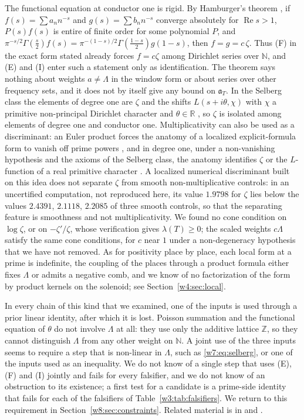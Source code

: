 \documentclass[11pt]{amsart}
\theoremstyle{definition}
\theoremstyle{remark}
\numberwithin{equation}{section}
\newcommand{\R}{\mathbb{R}}
\newcommand{\N}{\mathbb{N}}
\newcommand{\Z}{\mathbb{Z}}
\DeclareMathOperator{\Rel}{Re}
\newcommand{\aT}{\mathfrak{a}_T}                       %
\newcommand{\lam}{\lambda(T)}                          %
\begin{document}
The functional equation at conductor one is rigid. By Hamburger's theorem \cite{Hamburger1921}, if
$f(s)=\sum a_nn^{-s}$ and $g(s)=\sum b_nn^{-s}$ converge absolutely for $\Rel s>1$, $P(s)f(s)$ is entire of
finite order for some polynomial $P$, and
$\pi^{-s/2}\Gamma(\frac s2)f(s)=\pi^{-(1-s)/2}\Gamma(\frac{1-s}2)g(1-s)$, then $f=g=c\,\zeta$. Thus (F) in the
exact form stated already forces $f=c\zeta$ among Dirichlet series over $\N$, and (E) and (I) enter such a
statement only as identification. The theorem says nothing about weights $a\ne\Lambda$ in the window form or
about series over other frequency sets, and it does not by itself give any bound on $\aT$. In the Selberg
class the elements of degree one are $\zeta$ and the shifts $L(s+i\theta,\chi)$ with $\chi$ a primitive
non-principal Dirichlet character and $\theta\in\R$ \cite{KaczorowskiPerelli1999}, so $\zeta$ is isolated
among elements of degree one and conductor one. Multiplicativity can also be used as a discriminant: an Euler
product forces the anatomy of a localized explicit-formula form to vanish off prime powers
\cite[Theorem~3.1]{P10}, and in degree one, under a non-vanishing hypothesis and the axioms of the Selberg
class, the anatomy identifies $\zeta$ or the $L$-function of a real primitive character
\cite[Theorem~10.1]{P10}. A localized numerical discriminant built on this idea does not separate $\zeta$ from
smooth non-multiplicative controls: in an uncertified computation, not reproduced here, its value $1.9798$ for
$\zeta$ lies below the values $2.4391$, $2.1118$, $2.2085$ of three smooth controls, so that the separating
feature is smoothness and not multiplicativity. We found no cone condition on $\log\zeta$, or on
$-\zeta'/\zeta$, whose verification gives $\lam\ge0$; the scaled weights $c\Lambda$ satisfy the same cone
conditions, for $c$ near $1$ under a non-degeneracy hypothesis that we have not removed. As for positivity
place by place, each local form at a prime is indefinite, the coupling of the places through a product formula
either fixes $\Lambda$ or admits a negative comb, and we know of no factorization of the form by product
kernels on the solenoid; see Section~\ref{w4:sec:local}.

In every chain of this kind that we examined, one of the inputs is used through a prior linear identity, after
which it is lost. Poisson summation and the functional equation of $\theta$ do not involve $\Lambda$ at all:
they use only the additive lattice $\Z$, so they cannot distinguish $\Lambda$ from any other weight on $\N$. A
joint use of the three inputs seems to require a step that is non-linear in $\Lambda$, such as
\eqref{w7:eq:selberg}, or one of the inputs used as an inequality. We do not know of a single step that uses
(E), (F) and (I) jointly and fails for every falsifier, and we do not know of an obstruction to its existence;
a first test for a candidate is a prime-side identity that fails for each of the falsifiers of
Table~\ref{w3:tab:falsifiers}. We return to this requirement in Section~\ref{w8:sec:constraints}. Related
material is in \cite{P19} and \cite{DavenportHeilbronn1936}.
\end{document}
